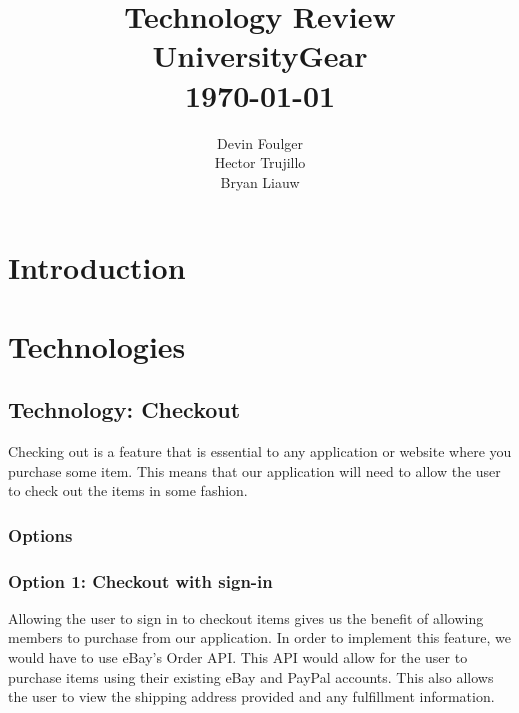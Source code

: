 \documentclass[journal,compsoc, 10pt, draftclsnofoot, onecolumn]{IEEEtran}
\begin{document}
\title{\vspace{20em}Technology Review \\{\vspace{-1ex}\huge UniversityGear} \\
{\large \today}}
\author{\vspace{10ex}Devin Foulger \\{\vspace{-1ex}Hector Trujillo}
\\{\vspace{-1ex}Bryan Liauw}}

\begin{titlepage}

\maketitle
\thispagestyle{empty}

\end{titlepage}

\tableofcontents

\section{Introduction}


\section{Technologies}
\subsection{Technology: Checkout}
Checking out is a feature that is essential to any application or website where
you purchase some item. This means that our application will need to allow the
user to check out the items in some fashion.

\subsubsection{Options}
\subsubsection*{Option 1: Checkout with sign-in}
Allowing the user to sign in to checkout items gives us the benefit of allowing
members to purchase from our application. In order to implement this feature, we 
would have to use eBay's Order API. This API would allow for the user to
purchase items using their existing eBay and PayPal accounts. This also allows
the user to view the shipping address provided and any fulfillment information.
\end{document}
